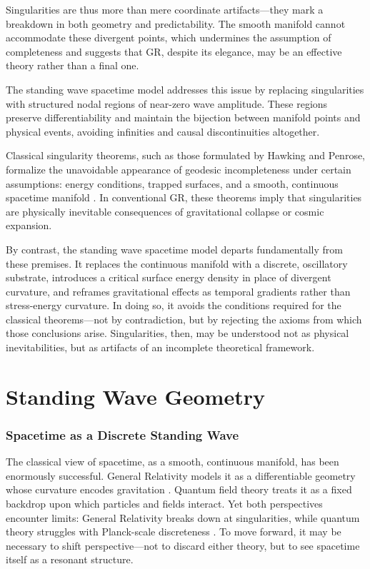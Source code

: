 \documentclass[12pt]{article}
\begin{document}
Singularities are thus more than mere coordinate artifacts---they mark a breakdown in both geometry and predictability. The smooth manifold cannot accommodate these divergent points, which undermines the assumption of completeness and suggests that GR, despite its elegance, may be an effective theory rather than a final one.

The standing wave spacetime model addresses this issue by replacing singularities with structured nodal regions of near-zero wave amplitude. These regions preserve differentiability and maintain the bijection between manifold points and physical events, avoiding infinities and causal discontinuities altogether.

Classical singularity theorems, such as those formulated by Hawking and Penrose, formalize the unavoidable appearance of geodesic incompleteness under certain assumptions: energy conditions, trapped surfaces, and a smooth, continuous spacetime manifold \citep{hawking1970}. In conventional GR, these theorems imply that singularities are physically inevitable consequences of gravitational collapse or cosmic expansion.

By contrast, the standing wave spacetime model departs fundamentally from these premises. It replaces the continuous manifold with a discrete, oscillatory substrate, introduces a critical surface energy density in place of divergent curvature, and reframes gravitational effects as temporal gradients rather than stress-energy curvature. In doing so, it avoids the conditions required for the classical theorems---not by contradiction, but by rejecting the axioms from which those conclusions arise. Singularities, then, may be understood not as physical inevitabilities, but as artifacts of an incomplete theoretical framework.


\cleardoublepage
\part{Standing Wave Geometry}

\section{Spacetime as a Discrete Standing Wave}

The classical view of spacetime, as a smooth, continuous manifold, has been enormously successful. General Relativity models it as a differentiable geometry whose curvature encodes gravitation \cite{misner1973}. Quantum field theory treats it as a fixed backdrop upon which particles and fields interact. Yet both perspectives encounter limits: General Relativity breaks down at singularities, while quantum theory struggles with Planck-scale discreteness \cite{amelino_camelia2002}. To move forward, it may be necessary to shift perspective---not to discard either theory, but to see spacetime itself as a resonant structure. 
\end{document}
